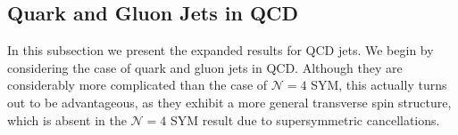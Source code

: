 \documentclass[letterpaper,11pt]{article}
\def\cN{\mathcal{N}}
\begin{document}
\subsection{Quark and Gluon Jets in QCD}\label{sec:QCD_power_discussion}

In this subsection we present the expanded results for QCD jets.
We begin by considering the case of quark and gluon jets in QCD. Although they are considerably more complicated than the case of $\cN=4$ SYM, this actually turns out to be advantageous, as they exhibit a more general transverse spin structure, which is absent in the $\cN=4$  SYM result due to supersymmetric cancellations.
\end{document}
